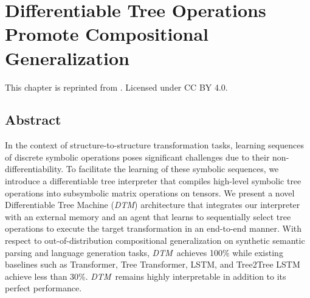 \newcommand{\blackboard}[0]{\emph{DTM}}
\newcommand{\car}{\texttt{car}}
\newcommand{\cdr}{\texttt{cdr}}
\newcommand{\cons}{\texttt{cons}}
\chapter{Differentiable Tree Operations Promote Compositional Generalization} \label{chap:chap-2}


\begin{singlespace}         %
    This chapter is reprinted from . Licensed under CC BY 4.0.
\end{singlespace} 

\section{Abstract}
In the context of structure-to-structure transformation tasks, learning sequences of discrete symbolic operations poses significant challenges due to their non-differentiability. To facilitate the learning of these symbolic sequences, we introduce a differentiable tree interpreter that compiles high-level symbolic tree operations into subsymbolic matrix operations on tensors. We present a novel Differentiable Tree Machine (\blackboard) architecture that integrates our interpreter with an external memory and an agent that learns to sequentially select tree operations to execute the target transformation in an end-to-end manner. With respect to out-of-distribution compositional generalization on synthetic semantic parsing and language generation tasks, \blackboard\ achieves 100\% while existing baselines such as Transformer, Tree Transformer, LSTM, and Tree2Tree LSTM achieve less than 30\%. \blackboard\ remains highly interpretable in addition to its perfect performance.

